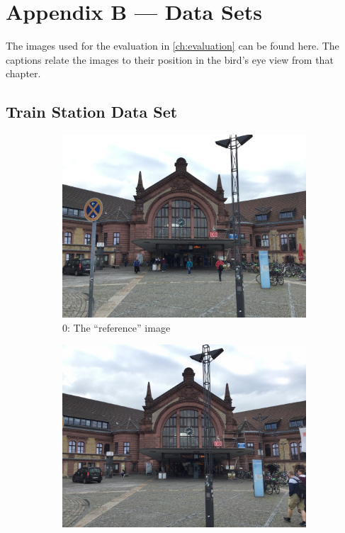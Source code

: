 \chapter{Appendix B --- Data Sets}\label{ch:appendixB}

The images used for the evaluation in \autoref{ch:evaluation} can be found here.
The captions relate the images to their position in the bird's eye view from
that chapter.

\section{Train Station Data Set}
\FloatBarrier
\begin{figure}[h]
   \begin{subfigure}[t]{.33\textwidth}
      \includegraphics[width=\textwidth]{gfx/bahnhof_imgs/0.JPG}
      \caption{$0$: The ``reference'' image}
   \end{subfigure}
   \begin{subfigure}[t]{.33\textwidth}
      \includegraphics[width=\textwidth]{gfx/bahnhof_imgs/5.JPG}

\end{subfigure}
\end{figure}
